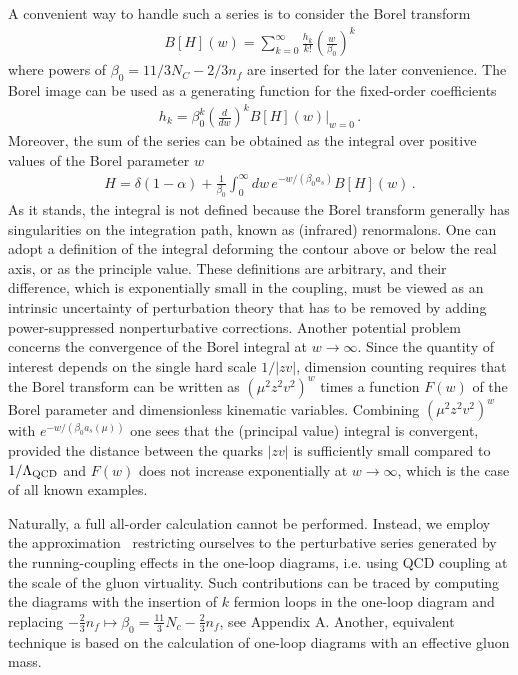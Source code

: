 \documentclass[aps,prd,twocolumn,a4paper,superscriptaddress,10pt,showpacs,notitlepage,floatfix]{revtex4-1}
\begin{document}
A convenient way to handle such a series is to consider the Borel transform
\begin{align}
  B[H] (w) = \sum_{k=0}^\infty \frac{h_k}{k!}\left(\frac{w}{\beta_0}\right)^k 
\end{align}
where powers of $\beta_0 = 11/3 N_C -2/3 n_f$ are inserted for the later convenience. The Borel image can be used as a generating function for the fixed-order coefficients
\begin{align}
 h_k = \beta_0^k \left(\frac{d}{dw}\right)^k  B[H] (w)\big|_{w=0}\,.
\end{align}
Moreover, the sum of the series can be obtained as the integral over positive values of the Borel parameter $w$
\begin{align}
\label{BorelIntegral}
H = \delta(1-\alpha)  + \frac{1}{\beta_0} \int_0^\infty \!dw\, e^{-w/(\beta_0 a_s)} B[H](w)\,. 
\end{align}
As it stands, the integral is not defined because the Borel transform generally has singularities on the integration path, known
as (infrared) renormalons. One can adopt a definition of the integral deforming the contour above or below the real
axis, or as the principle value. These definitions are arbitrary, and their difference, which is exponentially small in the 
coupling, must be viewed as an intrinsic uncertainty of perturbation theory that has to be removed by adding 
power-suppressed nonperturbative corrections. Another potential problem concerns the convergence of the Borel integral at 
$w\to\infty$. Since the quantity of interest depends on the single hard scale $1/|z v|$, dimension counting requires that the Borel
transform can be written as $(\mu^2 z^2 v^2 )^w$ times a function $F(w)$ of the Borel parameter and dimensionless kinematic variables.
Combining $(\mu^2 z^2 v^2)^w$ with $e^{-w/(\beta_0 a_s(\mu))}$ one sees that the (principal value) integral is convergent, provided 
the distance between the quarks $|zv|$ is sufficiently small compared to $1/\Lambda_{\rm QCD}$ and $F(w)$ does not increase exponentially
at $w\to\infty$, which is the case of all known examples. 

Naturally, a full all-order calculation cannot be performed. Instead, we employ the approximation~\cite{Beneke:1998ui,Beneke:2000kc}   
restricting ourselves to the perturbative series generated by the running-coupling effects in the one-loop diagrams, i.e. 
using QCD coupling at the scale of the gluon virtuality. 
Such contributions can be traced by computing  
the diagrams with the insertion of $k$ fermion loops in the one-loop diagram
and replacing  $- \frac23 n_f \mapsto   \beta_0 = \frac{11}{3} N_c - \frac23 n_f$, see Appendix A.
Another, equivalent technique \cite{Ball:1995ni} is based on the calculation of one-loop diagrams with an effective gluon mass.
\end{document}
